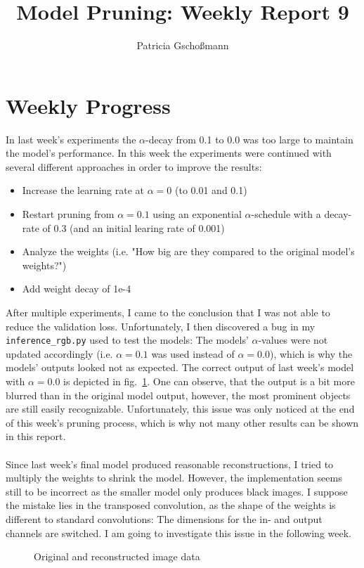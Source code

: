 \documentclass[10pt,twocolumn,letterpaper]{article}
\begin{document}
\title{Model Pruning: Weekly Report 9}
\author{Patricia Gschoßmann}

\maketitle

\section{Weekly Progress}
In last week's experiments the $\alpha$-decay from 0.1 to 0.0 was too large to maintain the model's performance.
In this week the experiments were continued with several different approaches in order to improve the results:
\begin{itemize}
	\item Increase the learning rate at $\alpha=0$ (to 0.01 and 0.1)
	\item Restart pruning from $\alpha=0.1$ using an exponential $\alpha$-schedule with a decay-rate of 0.3 (and an initial learing rate of 0.001)
	\item Analyze the weights (i.e. "How big are they compared to the original model's weights?")
	\item Add weight decay of 1e-4
\end{itemize}
After multiple experiments, I came to the conclusion that I was not able to reduce the validation loss.
Unfortunately, I then discovered a bug in my \texttt{inference\_rgb.py} used to test the models:
The models' $\alpha$-values were not updated accordingly (i.e. $\alpha=0.1$ was used instead of $\alpha=0.0$), which is why the models' outputs looked not as expected.
The correct output of last week's model with $\alpha=0.0$ is depicted in fig.~\ref{fig:true}.
One can observe, that the output is a bit more blurred than in the original model output, however, the most prominent objects are still easily recognizable.
Unfortunately, this issue was only noticed at the end of this week's pruning process, which is why not many other results can be shown in this report.\\\\
Since last week's final model produced reasonable reconstructions, I tried to multiply the weights to shrink the model.
However, the implementation seems still to be incorrect as the smaller model only produces black images.
I suppose the mistake lies in the transposed convolution, as the shape of the weights is different to standard convolutions:
The dimensions for the in- and output channels are switched.
I am going to investigate this issue in the following week.
\begin{figure}[hpbt]
	\centering
	\qquad
	\qquad
	\caption[]{Original and reconstructed image data}
	\label{fig:true}
\end{figure}
\end{document}
